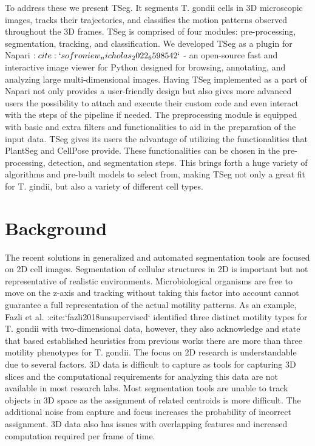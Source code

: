 \documentclass[./dissertation.tex]{subfiles}
\begin{document}
To address these we present TSeg. It segments T. gondii cells in 3D microscopic images, tracks their trajectories, and classifies the motion patterns observed throughout the 3D frames. TSeg is comprised of four modules: pre-processing, segmentation, tracking, and classification. We developed TSeg as a plugin for Napari $:cite:`sofroniew_nicholas_2022_6598542`$ - an open-source fast and interactive image viewer for Python designed for browsing, annotating, and analyzing large multi-dimensional images. Having TSeg implemented as a part of Napari not only provides a user-friendly design but also gives more advanced users the possibility to attach and execute their custom code and even interact with the steps of the pipeline if needed. The preprocessing module is equipped with basic and extra filters and functionalities to aid in the preparation of the input data. TSeg gives its users the advantage of utilizing the functionalities that PlantSeg and CellPose provide. These functionalities can be chosen in the pre-processing, detection, and segmentation steps. This brings forth a huge variety of algorithms and pre-built models to select from, making TSeg not only a great fit for T. gindii, but also a variety of different cell types.


\section{Background}

The recent solutions in generalized and automated segmentation tools are focused on 2D cell images. Segmentation of cellular structures in 2D is important but not representative of realistic environments. Microbiological organisms are free to move on the z-axis and tracking without taking this factor into account cannot guarantee a full representation of the actual motility patterns. As an example, Fazli et al. :cite:`fazli2018unsupervised` identified three distinct motility types for T. gondii with two-dimensional data, however, they also acknowledge and state that based established heuristics from previous works there are more than three motility phenotypes for T. gondii. The focus on 2D research is understandable due to several factors. 3D data is difficult to capture as tools for capturing 3D slices and the computational requirements for analyzing this data are not available in most research labs. Most segmentation tools are unable to track objects in 3D space as the assignment of related centroids is more difficult. The additional noise from capture and focus increases the probability of incorrect assignment. 3D data also has issues with overlapping features and increased computation required per frame of time.
\end{document}
